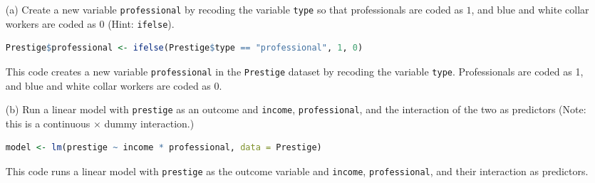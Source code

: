 \documentclass[12pt,letterpaper]{article}
\begin{document}
\newpage
\begin{enumerate}
	
	\item [(a)]
	Create a new variable \texttt{professional} by recoding the variable \texttt{type} so that professionals are coded as $1$, and blue and white collar workers are coded as $0$ (Hint: \texttt{ifelse}).
	
	\vspace{0.05cm}
		
		\begin{lstlisting}[language=R]
			Prestige$professional <- ifelse(Prestige$type == "professional", 1, 0)
		\end{lstlisting}
		
		This code creates a new variable \texttt{professional} in the \texttt{Prestige} dataset by recoding the variable \texttt{type}. Professionals are coded as 1, and blue and white collar workers are coded as 0.
	\end{enumerate}
	\begin{enumerate}
	\item [(b)]
	Run a linear model with \texttt{prestige} as an outcome and \texttt{income}, \texttt{professional}, and the interaction of the two as predictors (Note: this is a continuous $\times$ dummy interaction.)
	
	\vspace{0.05cm}
		
		\begin{lstlisting}[language=R]
			model <- lm(prestige ~ income * professional, data = Prestige)
		\end{lstlisting}
		
		This code runs a linear model with \texttt{prestige} as the outcome variable and \texttt{income}, \texttt{professional}, and their interaction as predictors.
		
	\end{enumerate}
	
\end{document}
